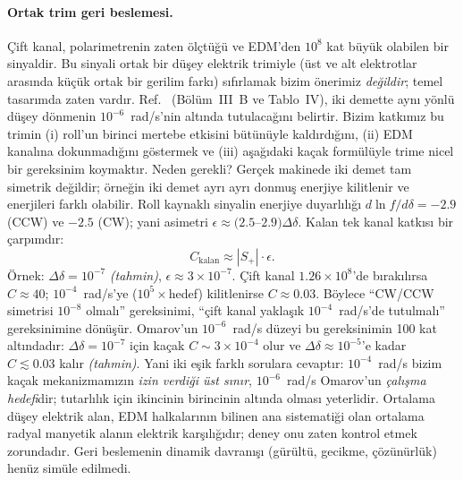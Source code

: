 \documentclass[11pt,a4paper]{article}
\newcommand{\tahmin}{\textit{(tahmin)}}
\begin{document}
\paragraph{Ortak trim geri beslemesi.} Çift kanal, polarimetrenin zaten ölçtüğü ve EDM'den $10^8$ kat büyük
olabilen bir sinyaldir. Bu sinyali ortak bir düşey elektrik trimiyle (üst ve alt elektrotlar arasında küçük
ortak bir gerilim farkı) sıfırlamak bizim önerimiz \emph{değildir}; temel tasarımda zaten vardır.
Ref.~\cite{omarov} (Bölüm~III~B ve Tablo~IV), iki demette aynı yönlü düşey dönmenin $10^{-6}$~rad/s'nin altında
tutulacağını belirtir. Bizim katkımız bu trimin (i) roll'un birinci mertebe etkisini bütünüyle kaldırdığını,
(ii) EDM kanalına dokunmadığını göstermek ve (iii) aşağıdaki kaçak formülüyle trime nicel bir gereksinim
koymaktır. Neden gerekli? Gerçek
makinede iki demet tam simetrik değildir; örneğin iki demet ayrı ayrı donmuş enerjiye kilitlenir ve enerjileri
farklı olabilir. Roll kaynaklı sinyalin enerjiye duyarlılığı $d\ln f/d\delta=-2.9$ (CCW) ve $-2.5$ (CW); yani
asimetri $\epsilon\approx(2.5$--$2.9)\Delta\delta$. Kalan tek kanal katkısı bir çarpımdır:
\begin{equation}
C_\text{kalan}\approx|S_+|\cdot\epsilon.
\end{equation}
Örnek: $\Delta\delta=10^{-7}$ \tahmin, $\epsilon\approx3\times10^{-7}$. Çift kanal $1.26\times10^8$'de bırakılırsa
$C\approx40$; $10^{-4}$~rad/s'ye ($10^5\times$hedef) kilitlenirse $C\approx0.03$. Böylece ``CW/CCW simetrisi
$10^{-8}$ olmalı'' gereksinimi, ``çift kanal yaklaşık $10^{-4}$~rad/s'de tutulmalı'' gereksinimine dönüşür.
Omarov'un $10^{-6}$~rad/s düzeyi bu gereksinimin 100 kat altındadır: $\Delta\delta=10^{-7}$ için kaçak
$C\sim3\times10^{-4}$ olur ve $\Delta\delta\approx10^{-5}$'e kadar $C\lesssim0.03$ kalır \tahmin. Yani iki eşik
farklı sorulara cevaptır: $10^{-4}$~rad/s bizim kaçak mekanizmamızın \emph{izin verdiği üst sınır},
$10^{-6}$~rad/s Omarov'un \emph{çalışma hedefi}dir; tutarlılık için ikincinin birincinin altında olması
yeterlidir. Ortalama düşey elektrik alan, EDM halkalarının bilinen ana sistematiği olan ortalama
radyal manyetik alanın elektrik karşılığıdır; deney onu zaten kontrol etmek zorundadır. Geri beslemenin dinamik
davranışı (gürültü, gecikme, çözünürlük) henüz simüle edilmedi.
\end{document}
